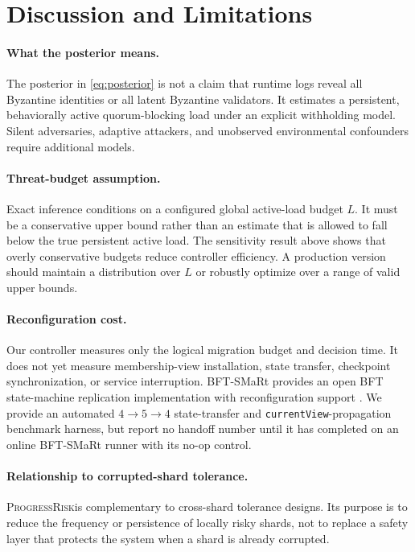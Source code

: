 \documentclass[10pt,conference]{IEEEtran}
\newcommand{\sysname}{\textsc{ProgressRisk}}
\begin{document}
\section{Discussion and Limitations}

\paragraph{What the posterior means.} The posterior in \eqref{eq:posterior} is not a claim that runtime logs reveal all Byzantine identities or all latent Byzantine validators. It estimates a persistent, behaviorally active quorum-blocking load under an explicit withholding model. Silent adversaries, adaptive attackers, and unobserved environmental confounders require additional models.

\paragraph{Threat-budget assumption.} Exact inference conditions on a configured global active-load budget $L$. It must be a conservative upper bound rather than an estimate that is allowed to fall below the true persistent active load. The sensitivity result above shows that overly conservative budgets reduce controller efficiency. A production version should maintain a distribution over $L$ or robustly optimize over a range of valid upper bounds.

\paragraph{Reconfiguration cost.} Our controller measures only the logical migration budget and decision time. It does not yet measure membership-view installation, state transfer, checkpoint synchronization, or service interruption. BFT-SMaRt provides an open BFT state-machine replication implementation with reconfiguration support \cite{bftsmart}.  We provide an automated $4\rightarrow5\rightarrow4$ state-transfer and \texttt{currentView}-propagation benchmark harness, but report no handoff number until it has completed on an online BFT-SMaRt runner with its no-op control.

\paragraph{Relationship to corrupted-shard tolerance.} \sysname is complementary to cross-shard tolerance designs. Its purpose is to reduce the frequency or persistence of locally risky shards, not to replace a safety layer that protects the system when a shard is already corrupted.
\end{document}
